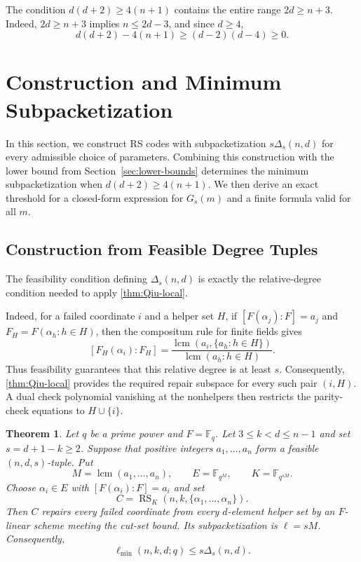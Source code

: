 \documentclass[11pt,onecolumn]{IEEEtran}
\newtheorem{theorem}{Theorem}
\newcommand{\F}{\mathbb{F}}
\newcommand{\lcmop}{\operatorname{lcm}}
\newcommand{\RS}{\operatorname{RS}}
\newcommand{\ellmin}{\ell_{\min}}
\begin{document}
The condition $d(d+2)\geq 4(n+1)$ contains the entire range
$2d\geq n+3$.  Indeed, $2d\geq n+3$ implies $n\le2d-3$, and since
$d\ge4$,
\[
d(d+2)-4(n+1)
\ge(d-2)(d-4)\ge0.
\]

\section{Construction and Minimum Subpacketization}
\label{sec:construction}
In this section, we construct RS codes with subpacketization
$s\Delta_s(n,d)$ for every admissible choice of parameters.
Combining this construction with the lower bound from
Section~\ref{sec:lower-bounds} determines the minimum
subpacketization when $d(d+2)\geq 4(n+1)$.
We then derive an exact threshold for a closed-form expression
for $G_s(m)$ and a finite formula valid for all $m$.


\subsection{Construction from Feasible Degree Tuples}

The feasibility condition defining $\Delta_s(n,d)$ is exactly the
relative-degree condition needed to apply \cref{thm:Qiu-local}.

Indeed, for a failed coordinate $i$ and a helper set $H$, if
$[F(\alpha_j):F]=a_j$ and $F_H=F(\alpha_h:h\in H)$, then the compositum
rule for finite fields gives
\[
[F_H(\alpha_i):F_H]
=\frac{\lcmop(a_i,\{a_h:h\in H\})}
       {\lcmop(a_h:h\in H)}.
\]
Thus feasibility guarantees that this relative degree is at least $s$.
Consequently, \cref{thm:Qiu-local} provides the required repair
subspace for every such pair $(i,H)$.  A dual check polynomial vanishing
at the nonhelpers then restricts the parity-check equations to
$H\cup\{i\}$.

\begin{theorem}
\label{thm:degree-construction}
Let $q$ be a prime power and $F=\F_q$.
Let $3\le k<d\le n-1$ and set $s=d+1-k\ge2$.
Suppose that positive integers $a_1,\ldots,a_n$ form a feasible
$(n,d,s)$-tuple.  Put
\[
 M=\lcmop(a_1,\ldots,a_n),
 \qquad
 E=\F_{q^M},
 \qquad
 K=\F_{q^{sM}}.
\]
Choose $\alpha_i\in E$ with $[F(\alpha_i):F]=a_i$ and set
\[
 C=\RS_K(n,k,\{\alpha_1,\ldots,\alpha_n\}).
\]
Then $C$ repairs every failed coordinate from every $d$-element helper
set by an $F$-linear scheme meeting the cut-set bound.  Its
subpacketization is $\ell=sM$.  Consequently,
\[
 \ellmin(n,k,d;q)\le s\Delta_s(n,d).
\]
\end{theorem}
\end{document}
